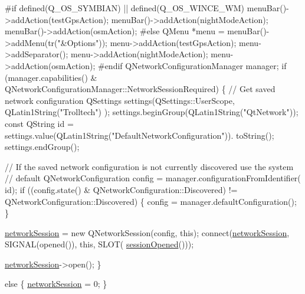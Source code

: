 \begin{DoxyCode}
\textcolor{preprocessor}{    #if defined(Q\_OS\_SYMBIAN) || defined(Q\_OS\_WINCE\_WM)}
\textcolor{preprocessor}{}        menuBar()->addAction(testGpsAction);
        menuBar()->addAction(nightModeAction);
        menuBar()->addAction(osmAction);
\textcolor{preprocessor}{    #else}
\textcolor{preprocessor}{}        QMenu *menu = menuBar()->addMenu(tr(\textcolor{stringliteral}{"&Options"}));
        menu->addAction(testGpsAction);
        menu->addSeparator();
        menu->addAction(nightModeAction);
        menu->addAction(osmAction);
\textcolor{preprocessor}{    #endif}
\textcolor{preprocessor}{}
    QNetworkConfigurationManager manager;
    \textcolor{keywordflow}{if} (manager.capabilities() & 
      QNetworkConfigurationManager::NetworkSessionRequired)
    \{
            \textcolor{comment}{// Get saved network configuration}
            QSettings settings(QSettings::UserScope, QLatin1String(\textcolor{stringliteral}{"Trolltech"})
      );
            settings.beginGroup(QLatin1String(\textcolor{stringliteral}{"QtNetwork"}));
            \textcolor{keyword}{const} QString \textcolor{keywordtype}{id} =
                settings.value(QLatin1String(\textcolor{stringliteral}{"DefaultNetworkConfiguration"})).
      toString();
            settings.endGroup();

            \textcolor{comment}{// If the saved network configuration is not currently discovered
       use the system}
            \textcolor{comment}{// default}
            QNetworkConfiguration config = manager.configurationFromIdentifier(\textcolor{keywordtype}{
      id});
            \textcolor{keywordflow}{if} ((config.state() & QNetworkConfiguration::Discovered) !=
                QNetworkConfiguration::Discovered)
            \{
                config = manager.defaultConfiguration();
            \}

            \hyperlink{classMainWindow_a638a10aec0de799787205387ee4da83e}{networkSession} = \textcolor{keyword}{new} QNetworkSession(config, \textcolor{keyword}{this});
            connect(\hyperlink{classMainWindow_a638a10aec0de799787205387ee4da83e}{networkSession}, SIGNAL(opened()), \textcolor{keyword}{this}, SLOT(
      \hyperlink{classMainWindow_ab218243366728139f7af5b3d6d97e8af}{sessionOpened}()));

            \hyperlink{classMainWindow_a638a10aec0de799787205387ee4da83e}{networkSession}->open();
    \}

    \textcolor{keywordflow}{else}
    \{
            \hyperlink{classMainWindow_a638a10aec0de799787205387ee4da83e}{networkSession} = 0;
    \}


\end{DoxyCode}
